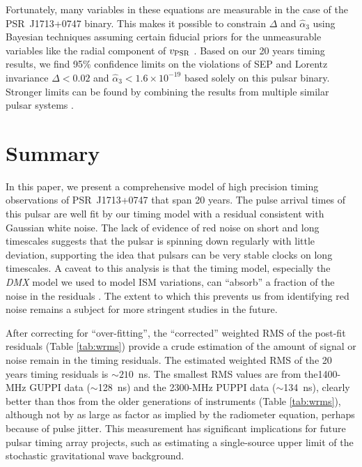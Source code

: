 Fortunately, many variables in these equations are measurable in the
case of the PSR~J1713+0747 binary. This makes it possible to constrain $\Delta$
and $\hat{\alpha}_3$ using Bayesian techniques assuming certain fiducial
priors for the unmeasurable variables like the radial component of
$v_{\rm PSR}$ \citep{sns+05, sfl+05, gsf+11}. Based on our 20 years 
timing results, we find 95\% confidence limits on the violations of SEP and
Lorentz invariance $\Delta < 0.02$ and
$\hat{\alpha}_3<1.6\times10^{-19}$ based solely on this pulsar
binary.  Stronger limits can be found by combining the results from
multiple similar pulsar systems \citep{wex00,sfl+05, gsf+11}.


\section{Summary}
In this paper, we present a comprehensive model of high precision timing observations of
PSR~J1713+0747 that span 20 years. 
The pulse arrival times of this pulsar are well fit by our timing model with a
residual consistent with Gaussian white noise.
The lack of evidence of red noise on short and long timescales suggests that
the pulsar is spinning down regularly with little deviation, supporting the
idea that pulsars can be very stable clocks on long timescales.
A caveat to this analysis is that the timing model, especially the
\textit{DMX} model we used to model ISM variations, can ``absorb'' a fraction
of the noise in the residuals \citep{kcs+13}. The extent to which this prevents us from
identifying red noise remains a subject for more stringent studies in the
future.

After correcting for ``over-fitting'', the ``corrected'' weighted RMS of the post-fit residuals (Table \ref{tab:wrms}) provide a crude estimation of
the amount of signal or noise remain in the timing residuals. The estimated
weighted RMS of the 20 years timing residuals is $\sim 210$~ns. The smallest
RMS values are from the1400-MHz GUPPI data ($\sim$128~ns) and the
2300-MHz PUPPI data ($\sim$134~ns),
clearly better than thos from the older generations of instruments 
(Table \ref{tab:wrms}), although not by as large as factor as implied
by the radiometer equation, perhaps because of pulse jitter. 
This measurement has significant implications for future pulsar timing array
projects, such as estimating a single-source
upper limit of the stochastic gravitational wave background.


